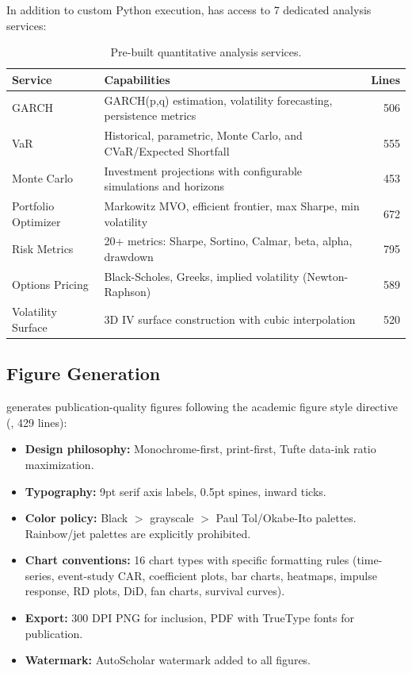 In addition to custom Python execution, \fisher has access to 7 dedicated analysis services:

\begin{table}[H]
\centering
\caption{Pre-built quantitative analysis services.}
\label{tab:analysis-services}
\begin{tabularx}{\textwidth}{lXr}
\toprule
\textbf{Service} & \textbf{Capabilities} & \textbf{Lines} \\
\midrule
GARCH & GARCH(p,q) estimation, volatility forecasting, persistence metrics & 506 \\
VaR & Historical, parametric, Monte Carlo, and CVaR/Expected Shortfall & 555 \\
Monte Carlo & Investment projections with configurable simulations and horizons & 453 \\
Portfolio Optimizer & Markowitz MVO, efficient frontier, max Sharpe, min volatility & 672 \\
Risk Metrics & 20+ metrics: Sharpe, Sortino, Calmar, beta, alpha, drawdown & 795 \\
Options Pricing & Black-Scholes, Greeks, implied volatility (Newton-Raphson) & 589 \\
Volatility Surface & 3D IV surface construction with cubic interpolation & 520 \\
\bottomrule
\end{tabularx}
\end{table}

\subsection{Figure Generation}

\fisher generates publication-quality figures following the academic figure style directive (, 429 lines):

\begin{itemize}
  \item \textbf{Design philosophy:} Monochrome-first, print-first, Tufte data-ink ratio maximization.
  \item \textbf{Typography:} 9pt serif axis labels, 0.5pt spines, inward ticks.
  \item \textbf{Color policy:} Black $>$ grayscale $>$ Paul Tol/Okabe-Ito palettes. Rainbow/jet palettes are explicitly prohibited.
  \item \textbf{Chart conventions:} 16 chart types with specific formatting rules (time-series, event-study CAR, coefficient plots, bar charts, heatmaps, impulse response, RD plots, DiD, fan charts, survival curves).
  \item \textbf{Export:} 300 DPI PNG for inclusion, PDF with TrueType fonts for publication.
  \item \textbf{Watermark:} AutoScholar watermark added to all figures.
\end{itemize}

